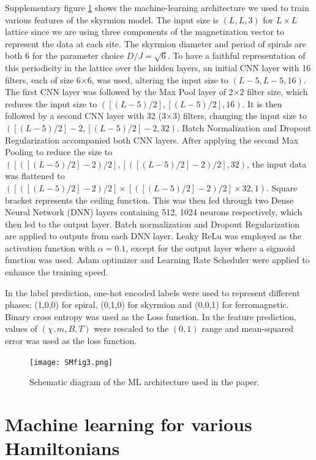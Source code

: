 \documentclass[reprint,amsmath,amssymb,aps,showpacs,onecolumn,superscriptaddress,prb]{revtex4-1}
\begin{document}
\begin{widetext}
Supplementary figure \ref{fig:SM1} shows the machine-learning architecture we used to train various features of the skyrmion model. The input size is $(L,L,3)$ for $L\times L$ lattice since we are using three components of the magnetization vector to represent the data at each site.  The skyrmion diameter and period of spirals are both 6 for the parameter choice $D/J=\sqrt{6}$. To have a faithful representation of this periodicity in the lattice over the hidden layers, an initial CNN layer with 16 filters, each of size 6$\times$6, was used, altering the input size to $(L-5, L-5, 16)$. The first CNN layer was followed by the Max Pool layer of 2$\times$2 filter size, which reduces the input size to $([ ( L-5 ) /2 ] , [ (L - 5 ) /2 ] , 16)$. It is then followed by a second CNN layer with 32 (3$\times$3) filters, changing the input size to $([ ( L-5 ) /2 ] -2 , [ ( L-5 ) /2 ] -2 , 32)$.  Batch Normalization and Dropout Regularization accompanied both CNN layers. After applying the second Max Pooling to reduce the size to $([([(L-5)/2]-2)/2], [([(L-5)/2]-2)/2], 32)$, the input data was flattened to $([([(L-5)/2]-2)/2]\times [([(L-5)/2]-2)/2] \times 32, 1)$. Square bracket represents the ceiling function. This was then fed through two Dense Neural Network (DNN) layers containing 512, 1024 neurons respectively, which then led to the output layer. Batch normalization and Dropout Regularization are applied to outputs from each DNN layer. Leaky ReLu was employed as the activation function with $\alpha=0.1$, except for the output layer where a sigmoid function was used. Adam optimizer and Learning Rate Scheduler were applied to enhance the training speed.

In the label prediction, one-hot encoded labels were used to represent different phases: (1,0,0) for spiral, (0,1,0) for skyrmion and (0,0,1) for ferromagnetic.  Binary cross entropy was used as the Loss function. In the feature prediction,  values of $(\chi,  m, B, T)$ were rescaled to the $(0,1)$ range and mean-squared error was used as the loss function.

\begin{figure}[ht]
\texttt{[image: SMfig3.png]}
\caption{Schematic diagram of the ML architecture used in the paper.}\label{fig:SM1}
\end{figure}

\section{Machine learning for various Hamiltonians}


\end{widetext}
\end{document}
